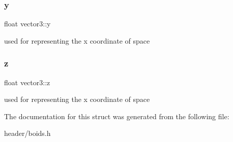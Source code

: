 \subsubsection{\texorpdfstring{y}{y}}
{\footnotesize\ttfamily float vector3\+::y}

used for representing the x coordinate of space \mbox{\label{structvector3_a850da8a0f71ec04b32739c4410a60746}} 
\subsubsection{\texorpdfstring{z}{z}}
{\footnotesize\ttfamily float vector3\+::z}

used for representing the x coordinate of space 

The documentation for this struct was generated from the following file\+:\begin{DoxyCompactItemize}
\item 
header/boids.\+h\end{DoxyCompactItemize}
